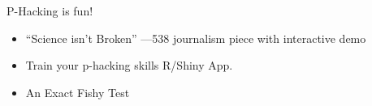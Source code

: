 \documentclass{beamer}
\begin{document}


{ %
    \begin{frame}[plain, label=AEAreg]
     \end{frame}
}

\begin{frame}{P-Hacking is fun!}
\begin{itemize}
\item
``Science isn't Broken'' ---538 journalism piece with interactive demo \href{http://fivethirtyeight.com/features/science-isnt-broken}{}
\item 
Train your p-hacking skills R/Shiny App. \href{http://www.nicebread.de/introducing-p-hacker/}{}
\item
An Exact Fishy Test \href{https://macartan.shinyapps.io/fish/}{}
\end{itemize}
\end{frame}
\end{document}
